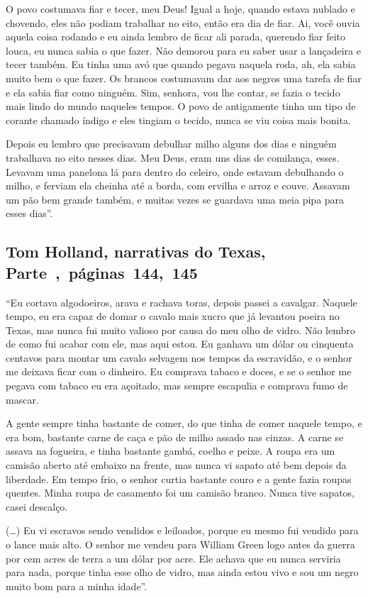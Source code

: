 O povo costumava fiar e tecer, meu Deus! Igual a hoje, quando estava
nublado e chovendo, eles não podiam trabalhar no eito, então era dia de
fiar. Ai, você ouvia aquela coisa rodando e eu ainda lembro de ficar ali
parada, querendo fiar feito louca, eu nunca sabia o que fazer. Não
demorou para eu saber usar a lançadeira e tecer também. Eu tinha uma avó
que quando pegava naquela roda, ah, ela sabia muito bem o que fazer. Os
brancos costumavam dar aos negros uma tarefa de fiar e ela sabia fiar
como ninguém. Sim, senhora, vou lhe contar, se fazia o tecido mais lindo
do mundo naqueles tempos. O povo de antigamente tinha um tipo de corante
chamado índigo e eles tingiam o tecido, nunca se viu coisa mais bonita.

Depois eu lembro que precisavam debulhar milho alguns dos dias e ninguém
trabalhava no eito nesses dias. Meu Deus, eram uns dias de comilança,
esses. Levavam uma panelona lá para dentro do celeiro, onde estavam
debulhando o milho, e ferviam ela cheinha até a borda, com ervilha e
arroz e couve. Assavam um pão bem grande também, e muitas vezes se
guardava uma meia pipa para esses dias''.

\subsection{Tom Holland, narrativas do Texas, Parte~,~páginas~144,~145}
\label{ref147}

``Eu cortava algodoeiros, arava e rachava toras, depois passei a
cavalgar. Naquele tempo, eu era capaz de domar o cavalo mais xucro que
já levantou poeira no Texas, mas nunca fui muito valioso por causa do
meu olho de vidro. Não lembro de como fui acabar com ele, mas aqui
estou. Eu ganhava um dólar ou cinquenta centavos para montar um cavalo
selvagem nos tempos da escravidão, e o senhor me deixava ficar com o
dinheiro. Eu comprava tabaco e doces, e se o senhor me pegava com tabaco
eu era açoitado, mas sempre escapulia e comprava fumo de mascar.

A gente sempre tinha bastante de comer, do que tinha de comer naquele
tempo, e era bom, bastante carne de caça e pão de milho assado nas
cinzas. A carne se assava na fogueira, e tinha bastante gambá, coelho e
peixe. A roupa era um camisão aberto até embaixo na frente, mas nunca vi
sapato até bem depois da liberdade. Em tempo frio, o senhor curtia
bastante couro e a gente fazia roupas quentes. Minha roupa de casamento
foi um camisão branco. Nunca tive sapatos, casei descalço.

(\ldots{}) Eu vi escravos sendo vendidos e leiloados, porque eu mesmo
fui vendido para o lance mais alto. O senhor me vendeu para William
Green logo antes da guerra por cem acres de terra a um dólar por acre.
Ele achava que eu nunca serviria para nada, porque tinha esse olho de
vidro, mas ainda estou vivo e sou um negro muito bom para a minha
idade''.


